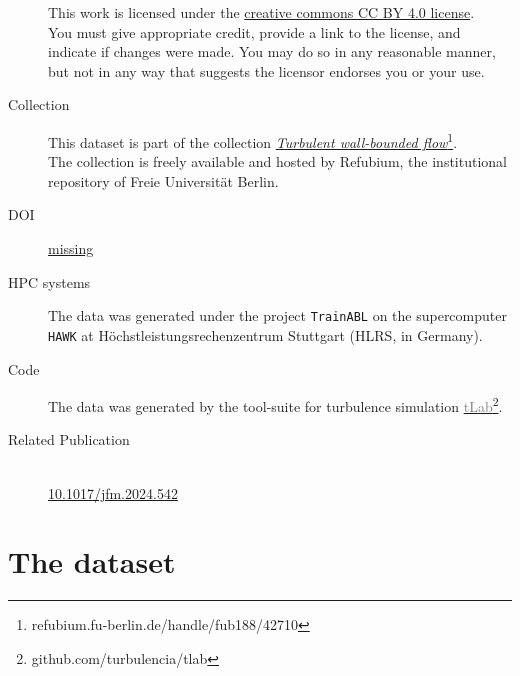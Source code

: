 \documentclass[11pt]{article}
\newcommand{\doi}{missing}
\newcommand{\tlabName}{\textcolor{gray}{tLab}}
\newcommand{\printdoi}[1]{\href{https://dx.doi.org/#1}{#1}}
\newcommand{\light}[1]{\textcolor{black!80}{#1}}
\begin{document}
\begin{description}

    \sffamily

\item[\textcopyright] This work is licensed under the \href{https://creativecommons.org/licenses/by/4.0}{creative commons CC BY 4.0 license}. \\ 
{\small\light{You must give appropriate credit, provide a link to the license, and indicate if changes were made. You may do so in any reasonable manner, but not in any way that suggests the licensor endorses you or your use. }}

\item[\sffamily Collection] This dataset is part of the collection \href{https://refubium.fu-berlin.de/handle/fub188/42710}{\emph{Turbulent wall-bounded flow}\footnote{\url{refubium.fu-berlin.de/handle/fub188/42710}}}. \\ 
{\small \light{The collection is freely available and hosted by Refubium, the  institutional repository of Freie Universit\"at Berlin.}}

\item[\sffamily DOI]\printdoi{\doi}

\item[\sffamily HPC systems] The data was generated under the project \texttt{TrainABL} on the supercomputer \texttt{HAWK} at Höchstleistungsrechenzentrum Stuttgart (HLRS, in Germany). 

\item[\sffamily Code] The data was generated by the tool-suite for turbulence simulation \href{https://github.com/turbulencia/tlab}{\tlabName\footnote{\url{github.com/turbulencia/tlab}}}.

\item[\sffamily Related Publication] \phantom{A}~\\
    \printdoi{10.1017/jfm.2024.542}\\

\end{description}

\section{The dataset}
\end{document}
